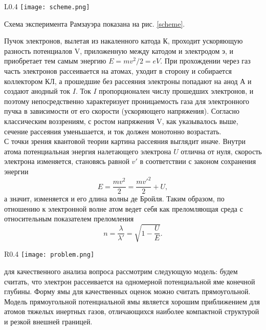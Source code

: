 \documentclass{physlab}
\begin{document}
\begin{wrapfigure}{L}{0.4\linewidth}
\centering
    \texttt{[image: scheme.png]}
\caption{Схема установки для измерения сечения рассеяния электронов в газах}
\label{scheme}
\end{wrapfigure}

Схема эксперимента Рамзауэра показана на рис. \ref{scheme}.

Пучок электронов, вылетая из накаленного катода К, проходит ускоряющую разность потенциалов V, приложенную между катодом и электродом э, и приобретает тем самым энергию $E = m v^2 /2 = eV$. При прохождении через газ часть электронов рассеивается на атомах, уходит в сторону и собирается коллектором КЛ, а прошедшие без рассеяния электроны попадают на анод А и создают анодный ток $I$. Ток $I$ пропорционален числу прошедших электронов, и поэтому непосредственно характеризует проницаемость газа для электронного пучка в зависимости от его скорости (ускоряющего напряжения). Согласно классическим воззрениям, с ростом напряжения V, как указывалось выше, сечение рассеяния уменьшается, и ток должен монотонно возрастать. \\

С точки зрения квантовой теории картина рассеяния выглядит иначе. Внутри атома потенциальная энергия налетающего электрона $U$ отлична от нуля, скорость электрона изменяется, становясь равной $v'$ в соответствии с законом сохранения энергии
\begin{equation}
E = \frac{m v^2}{2} = \frac{m v'^2}{2} + U,
\end{equation}
а значит, изменяется и его длина волны де Бройля. Таким образом, по отношению к электронной волне атом ведет себя как преломляющая среда с относительным показателем преломления
\begin{equation}
n = \frac{\lambda}{\lambda'} = \sqrt{1 - \frac{U}{E}}.
\end{equation}

\begin{wrapfigure}{R}{0.4\linewidth}
\centering
    \texttt{[image: problem.png]}
\caption{Схематическое изображение прямоугольной ямы, над которой пролетает частица с энергией $E$}
\label{problem} 
\end{wrapfigure}

для качественного анализа вопроса рассмотрим следующую модель: будем считать, что электрон рассеивается на одномерной потенциальной яме конечной глубины. Форму ямы для качественных оценок можно считать прямоугольной. Модель прямоугольной потенциальной ямы является хорошим приближением для атомов тяжелых инертных газов, отличающихся наиболее компактной структурой и резкой внешней границей.
\end{document}
